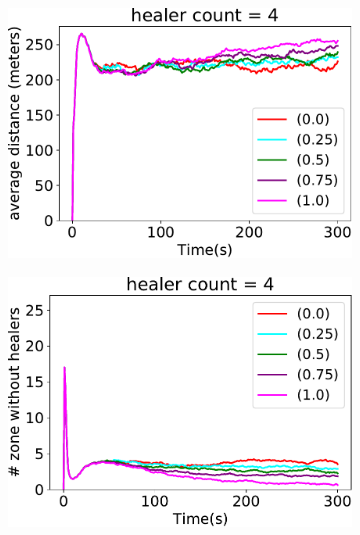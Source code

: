 \begin{figure}[t!]
\begin{subfigure}[b]{0.32\textwidth}
\includegraphics[width=\textwidth]{papers/mdpi2020/imgs/avg-distance-from-leader-4.pdf}
\end{subfigure}
\hfill
%
\begin{subfigure}[b]{0.32\textwidth}
\centering
\includegraphics[width=\textwidth]{papers/mdpi2020/imgs/empty-zone-4.pdf}
\end{subfigure}
\par\bigskip %
\centering
\begin{subfigure}[b]{0.32\textwidth}
\centering

\end{subfigure}
\end{figure}
